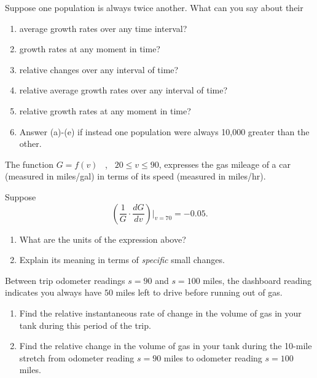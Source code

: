 \documentclass{ximera}
\begin{document}
\begin{question}  \label{Qomfe03r3}

Suppose one population is always twice another. What can you say about their
\begin{enumerate}

\item average growth rates over any time interval?

\item growth rates at any moment in time?

\item relative changes over any interval of time?

\item relative average growth rates over any interval of time?

\item relative growth rates at any moment in time?

\item Answer (a)-(e) if instead one population were always 10,000 greater than the other.

\end{enumerate} 

\end{question}


\begin{question} \label{Qif9f3r3r3fr}
The function $G = f(v)$ \, , \, $20 \leq v \leq90$, expresses the gas mileage of a car (measured in miles/gal) in terms of its speed (measured in miles/hr).

Suppose
\[
 \left( \frac{1}{G} \cdot \frac{dG}{dv}  \right) \Big|_{v=70} = -0.05.
\]

\begin{enumerate}
\item What are the units of the expression above?

\item Explain its meaning in terms of \emph{specific} small changes.
\end{enumerate}
\end{question}

\begin{question} \label{Qpdov34r34rr3}
Between trip odometer readings $s=90$ and $s=100$ miles, the dashboard reading indicates you always have $50$ miles left to drive before running out of gas.

\begin{enumerate}
\item Find the relative instantaneous rate of change in the volume of gas in your tank during this period of the trip.

\item Find the relative change in the volume of gas in your tank during the 10-mile stretch from odometer reading $s=90$ miles to odometer reading $s=100$ miles.

\end{enumerate}
\end{question}
\end{document}
